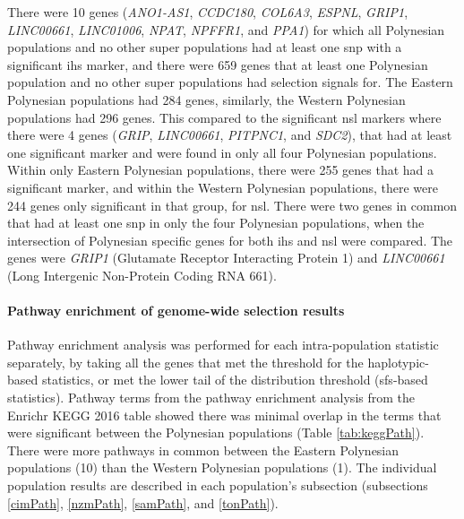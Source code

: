 \documentclass[]{report}
\let\oldparagraph\paragraph
\renewcommand{\paragraph}[1]{\oldparagraph{#1}\mbox{}}
\begin{document}
There were 10 genes (\emph{ANO1-AS1}, \emph{CCDC180}, \emph{COL6A3},
\emph{ESPNL}, \emph{GRIP1}, \emph{LINC00661}, \emph{LINC01006},
\emph{NPAT}, \emph{NPFFR1}, and \emph{PPA1}) for which all Polynesian
populations and no other super populations had at least one \gls{snp}
with a significant \gls{ihs} marker, and there were 659 genes that at
least one Polynesian population and no other super populations had
selection signals for. The Eastern Polynesian populations had 284 genes,
similarly, the Western Polynesian populations had 296 genes. This
compared to the significant \gls{nsl} markers where there were 4 genes
(\emph{GRIP}, \emph{LINC00661}, \emph{PITPNC1}, and \emph{SDC2}), that
had at least one significant marker and were found in only all four
Polynesian populations. Within only Eastern Polynesian populations,
there were 255 genes that had a significant marker, and within the
Western Polynesian populations, there were 244 genes only significant in
that group, for \gls{nsl}. There were two genes in common that had at
least one \gls{snp} in only the four Polynesian populations, when the
intersection of Polynesian specific genes for both \gls{ihs} and
\gls{nsl} were compared. The genes were \emph{GRIP1} (Glutamate Receptor
Interacting Protein 1) and \emph{LINC00661} (Long Intergenic Non-Protein
Coding RNA 661).

\paragraph{Pathway enrichment of genome-wide selection
results}\label{pathEnrich}

Pathway enrichment analysis was performed for each intra-population
statistic separately, by taking all the genes that met the threshold for
the haplotypic-based statistics, or met the lower tail of the
distribution threshold (\gls{sfs}-based statistics). Pathway terms from
the pathway enrichment analysis from the Enrichr KEGG 2016 table showed
there was minimal overlap in the terms that were significant between the
Polynesian populations (Table \ref{tab:keggPath}). There were more
pathways in common between the Eastern Polynesian populations (10) than
the Western Polynesian populations (1). The individual population
results are described in each population's subsection (subsections
\ref{cimPath}, \ref{nzmPath}, \ref{samPath}, and \ref{tonPath}).
\end{document}

